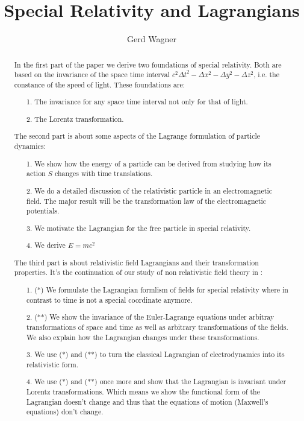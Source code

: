 \documentclass{article}
\begin{document}
\title{Special Relativity and Lagrangians}
\author{Gerd Wagner}

\maketitle

\begin{abstract}
In the first part of the paper we derive two foundations of special relativity.
Both are based on the invariance of the space time interval $c^2\Delta t^2 - \Delta x^2 - \Delta y^2 - \Delta z^2$,
i.e. the constance of the speed of light.
These foundations are:
\begin{itemize}
    \item[1.] The invariance for any space time interval not only for that of light.
    \item[2.] The Lorentz transformation.
\end{itemize}

The second part is about some aspects of the Lagrange formulation of particle dynamics:
\begin{itemize}
    \item[1.] We show how the energy of a particle can be derived from studying how its action $S$ changes with time translations.
    \item[2.] We do a detailed discussion of the relativistic particle in an electromagnetic field.
              The major result will be the transformation law of the electromagnetic potentials.
    \item[3.] We motivate the Lagrangian for the free particle in special relativity.
    \item[4.] We derive $E=mc^2$
\end{itemize}

The third part is about relativistic field Lagrangians and their transformation properties.
It's the continuation of our study of non relativistic field theory in \cite{LagrangeOfField}:
\begin{itemize}
    \item[1. (*)] We formulate the Lagrangian formlism of fields for special relativity where in contrast to \cite{LagrangeOfField} time is not a special coordinate anymore.
    \item[2. (**)] We show the invariance of the Euler-Lagrange equations under arbitray transformations of space and time as well as arbitrary transformations of the fields.
              We also explain how the Lagrangian changes under these transformations.
    \item[3.] We use (*) and (**) to turn the classical Lagrangian of electrodynamics into its relativistic form.
    \item[4.] We use (*) and (**) once more and show that the Lagrangian is invariant under Lorentz transformations.
              Which means we show the functional form of the Lagrangian doesn't change and thus that the equations of motion (Maxwell's equations) don't change.
\end{itemize}


\end{abstract}
\end{document}
